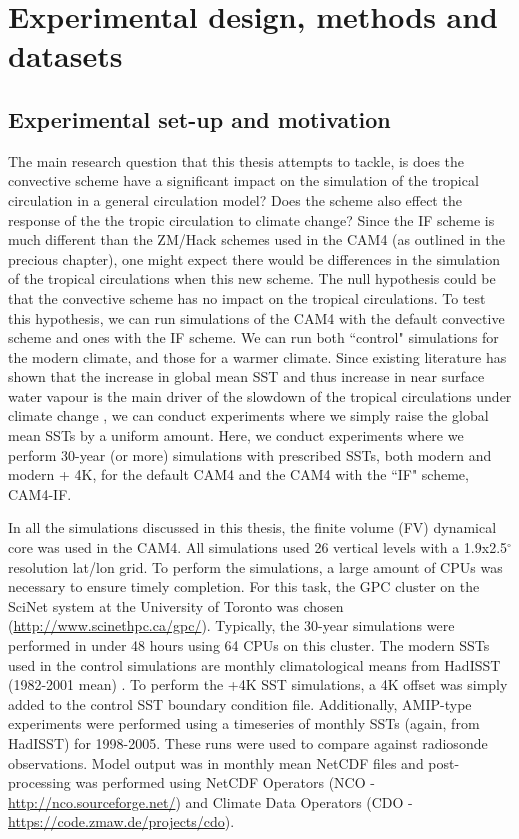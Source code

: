 \documentclass[letterpaper,12pt,titlepage,oneside,final]{book}
\begin{document}
\chapter{Experimental design, methods and datasets}

\section{Experimental set-up and motivation}

The main research question that this thesis attempts to tackle, is does the convective scheme have a significant impact on the simulation of the tropical circulation in a general circulation model? Does the scheme also effect the response of the the tropic circulation to climate change? Since the IF scheme is much different than the ZM/Hack schemes used in the CAM4 (as outlined in the precious chapter), one might expect there would be differences in the simulation of the tropical circulations when this new scheme. The null hypothesis could be that the convective scheme has no impact on the tropical circulations. To test this hypothesis, we can run simulations of the CAM4 with the default convective scheme and ones with the IF scheme. We can run both ``control" simulations for the modern climate, and those for a warmer climate. Since existing literature has shown that the increase in global mean SST and thus increase in near surface water vapour is the main driver of the slowdown of the tropical circulations under climate change \citep{held_robust_2006,ma_mechanisms_2011,vecchi_global_2007,he_anthropogenic_2015}, we can conduct experiments where we simply raise the global mean SSTs by a uniform amount. Here, we conduct experiments where we perform 30-year (or more) simulations with prescribed SSTs, both modern and modern + 4K, for the default CAM4 and the CAM4 with the ``IF" scheme, CAM4-IF.

In all the simulations discussed in this thesis, the finite volume (FV) dynamical core was used in the CAM4. All simulations used 26 vertical levels with a 1.9x2.5$^{\circ}$ resolution lat/lon grid. To perform the simulations, a large amount of CPUs was necessary to ensure timely completion. For this task, the GPC cluster on the SciNet system at the University of Toronto was chosen (\url{http://www.scinethpc.ca/gpc/}). Typically, the 30-year simulations were performed in under 48 hours using 64 CPUs on this cluster. The modern SSTs used in the control simulations are monthly climatological means from HadISST (1982-2001 mean) \citep{hurrell_new_2008}. To perform the +4K SST simulations, a 4K offset was simply added to the control SST boundary condition file. Additionally, AMIP-type experiments \citep{taylor_overview_2011} were performed using a timeseries of monthly SSTs (again, from HadISST) for 1998-2005. These runs were used to compare against radiosonde observations. Model output was in monthly mean NetCDF files and post-processing was performed using NetCDF Operators (NCO - \url{http://nco.sourceforge.net/}) and Climate Data Operators (CDO - \url{https://code.zmaw.de/projects/cdo}).
\end{document}
